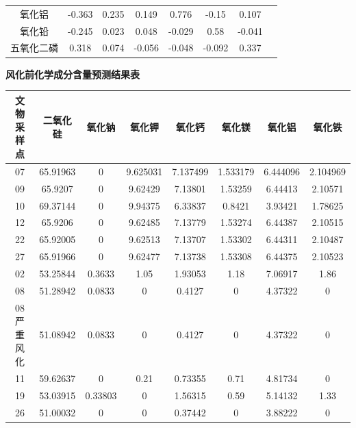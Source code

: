 \documentclass[withoutpreface,bwprint]{cumcmthesis} %
\begin{document}
\begin{appendices}
\begin{table}[H]
\begin{tabular}{cccccccc}
    氧化铝      & -0.363        & 0.235        & 0.149       & 0.776         & -0.15       & 0.107          &          \\
    氧化铅        & -0.245        & 0.023        & 0.048       & -0.029        & 0.58        & -0.041         &          \\
    五氧化二磷    & 0.318         & 0.074        & -0.056      & -0.048        & -0.092      & 0.337          &          \\ \bottomrule[1.5pt]
  \end{tabular}
\end{table}

\newpage
\textbf{风化前化学成分含量预测结果表}

\begin{table}[H]
  \begin{tabular}{cccccccc}
    \toprule[1.5pt]
    文物采样点  & 二氧化硅     & 氧化钠     & 氧化钾      & 氧化钙      & 氧化镁      & 氧化铝      & 氧化铁      \\ \hline
    07     & 65.91963 & 0       & 9.625031 & 7.137499 & 1.533179 & 6.444096 & 2.104969 \\
    09     & 65.9207  & 0       & 9.62429  & 7.13801  & 1.53259  & 6.44413  & 2.10571  \\
    10     & 69.37144 & 0       & 9.94375  & 6.33837  & 0.8421   & 3.93421  & 1.78625  \\
    12     & 65.9206  & 0       & 9.62485  & 7.13779  & 1.53274  & 6.44387  & 2.10515  \\
    22     & 65.92005 & 0       & 9.62513  & 7.13707  & 1.53302  & 6.44311  & 2.10487  \\
    27     & 65.91966 & 0       & 9.62477  & 7.13738  & 1.53308  & 6.44375  & 2.10523  \\
    02     & 53.25844 & 0.3633  & 1.05     & 1.93053  & 1.18     & 7.06917  & 1.86     \\
    08     & 51.28942 & 0.0833  & 0        & 0.4127   & 0        & 4.37322  & 0        \\
    08严重风化 & 51.08942 & 0.0833  & 0        & 0.4127   & 0        & 4.37322  & 0        \\
    11     & 59.62637 & 0       & 0.21     & 0.73355  & 0.71     & 4.81734  & 0        \\
    19     & 53.03915 & 0.33803 & 0        & 1.56315  & 0.59     & 5.14132  & 1.33     \\
    26     & 51.00032 & 0       & 0        & 0.37442  & 0        & 3.88222  & 0        \\

\end{tabular}
\end{table}
\end{appendices}
\end{document}
